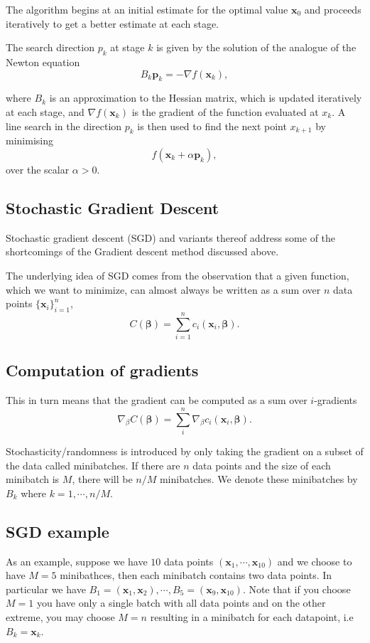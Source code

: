 \documentclass[%
oneside,                 %
final,                   %
10pt]{article}
\begin{document}
The algorithm begins at an initial estimate for the optimal value $\mathbf {x}_{0}$ and proceeds iteratively to get a better estimate at each stage.

The search direction $p_k$ at stage $k$ is given by the solution of the analogue of the Newton equation
\[
B_{k}\mathbf {p} _{k}=-\nabla f(\mathbf {x}_{k}),
\]

where $B_{k}$ is an approximation to the Hessian matrix, which is
updated iteratively at each stage, and $\nabla f(\mathbf {x} _{k})$
is the gradient of the function
evaluated at $x_k$. 
A line search in the direction $p_k$ is then used to
find the next point $x_{k+1}$ by minimising 
\[
f(\mathbf {x}_{k}+\alpha \mathbf {p}_{k}),
\]
over the scalar $\alpha > 0$.

\subsection*{Stochastic Gradient Descent}

Stochastic gradient descent (SGD) and variants thereof address some of
the shortcomings of the Gradient descent method discussed above.

The underlying idea of SGD comes from the observation that a given 
function, which we want to minimize, can almost always be written as a
sum over $n$ data points $\{\mathbf{x}_i\}_{i=1}^n$,
\[
C(\mathbf{\beta}) = \sum_{i=1}^n c_i(\mathbf{x}_i,
\mathbf{\beta}). 
\]

\subsection*{Computation of gradients}

This in turn means that the gradient can be
computed as a sum over $i$-gradients 
\[
\nabla_\beta C(\mathbf{\beta}) = \sum_i^n \nabla_\beta c_i(\mathbf{x}_i,
\mathbf{\beta}).
\]

Stochasticity/randomness is introduced by only taking the
gradient on a subset of the data called minibatches.  If there are $n$
data points and the size of each minibatch is $M$, there will be $n/M$
minibatches. We denote these minibatches by $B_k$ where
$k=1,\cdots,n/M$.

\subsection*{SGD example}
As an example, suppose we have $10$ data points $(\mathbf{x}_1,\cdots, \mathbf{x}_{10})$ 
and we choose to have $M=5$ minibathces,
then each minibatch contains two data points. In particular we have
$B_1 = (\mathbf{x}_1,\mathbf{x}_2), \cdots, B_5 =
(\mathbf{x}_9,\mathbf{x}_{10})$. Note that if you choose $M=1$ you
have only a single batch with all data points and on the other extreme,
you may choose $M=n$ resulting in a minibatch for each datapoint, i.e
$B_k = \mathbf{x}_k$.
\end{document}
